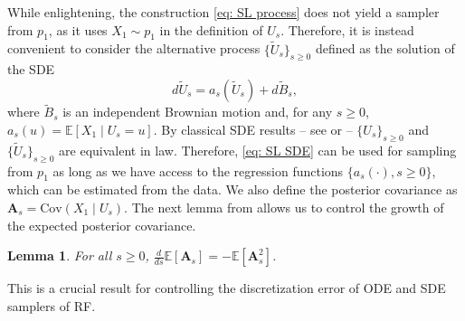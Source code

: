 \documentclass{article}
\theoremstyle{plain}
\newtheorem{lemma}[theorem]{Lemma}
\theoremstyle{definition}
\theoremstyle{remark}
\newcommand{\red}[1]{{\color{red}#1}}
\def\bA{\mathbf{A}}
\def\bbE{\mathbb{E}}
\def\Cov{\text{Cov}}
\newcommand{\bs}[1]{\left[{#1}\right]}
\begin{document}
While enlightening, the construction \eqref{eq: SL process} does not yield a sampler from $p_1$, as it uses $X_1 \sim p_1$ in the definition of $U_s$. Therefore, it is instead convenient to consider the alternative process $\{\tilde U_s\}_{s \geq 0}$ defined as the solution of the  SDE
\begin{equation}
    \label{eq: SL SDE}
    d\tilde U_s = a_s(\tilde U_s) + d \tilde B_s,
\end{equation}
where $\tilde B_s$ is an independent Brownian motion and, for any $s \geq 0$,  $a_s(u) = \bbE[X_1 \mid U_s = u]$. By classical SDE results -- see \citet[Theorem 8.4.3 ]{oksendal2003stochastic} or \citet[Theorem 7.12 ]{liptser2013statistics} -- $\{U_s\}_{s\ge 0}$ and $\{\tilde U_s\}_{s\ge 0}$ are equivalent in law. Therefore, \eqref{eq: SL SDE} can be used for sampling from $p_1$ as long as we have access to the regression functions $\{ a_s(\cdot), s \geq 0\}$, which can be estimated from the data. We also define the posterior covariance as $\bA_s = \Cov(X_1 \mid U_s)$. The next lemma from \citet{eldan2020taming} allows us to control the growth of the expected posterior covariance.
\begin{lemma}
    \label{lemma: eldan ddt cov lemma}
    For all $s\ge 0$, $\frac{d}{ds} \bbE\bs{\bA_s} = - \bbE\bs{\bA_s^2}$.
\end{lemma}
This is a crucial result for controlling the discretization error of ODE and SDE samplers of RF.
\end{document}
